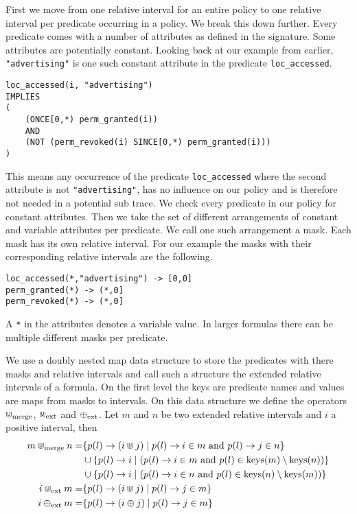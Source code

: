 First we move from one relative interval for an entire policy to one relative interval per predicate occurring in a policy.
We break this down further.
Every predicate comes with a number of attributes as defined in the signature.
Some attributes are potentially constant.
Looking back at our example from earlier, \texttt{"advertising"} is one such constant attribute in the predicate \texttt{loc\_accessed}.

\begin{verbatim}
loc_accessed(i, "advertising") 
IMPLIES 
(
    (ONCE[0,*) perm_granted(i)) 
    AND 
    (NOT (perm_revoked(i) SINCE[0,*) perm_granted(i)))
)
\end{verbatim}

This means any occurrence of the predicate \texttt{loc\_accessed} where the second attribute is not \texttt{"advertising"}, has no influence on our policy and is therefore not needed in a potential sub trace.
We check every predicate in our policy for constant attributes.
Then we take the set of different arrangements of constant and variable attributes per predicate.
We call one such arrangement a mask.
Each mask has its own relative interval.
For our example the masks with their corresponding relative intervals are the following.

\begin{verbatim}
loc_accessed(*,"advertising") -> [0,0]
perm_granted(*) -> (*,0]
perm_revoked(*) -> (*,0]
\end{verbatim}

A \texttt{*} in the attributes denotes a variable value.
In larger formulas there can be multiple different masks per predicate.

We use a doubly nested map data structure to store the predicates with there masks and relative intervals and call such a structure the extended relative intervals of a formula.
On the first level the keys are predicate names and values are maps from masks to intervals.
On this data structure we define the operators $\Cup_{\text{merge}}$, $\Cup_{\text{ext}}$ and $\oplus_{\text{ext}}$.
Let $m$ and $n$ be two extended relative intervals and $i$ a positive interval, then 
\begin{align*}
    m \Cup_{\text{merge}} n = 
        & \{ p(l) \rightarrow (i \Cup j) \mid 
            p(l) \rightarrow i \in m \text{ and } 
            p(l) \rightarrow j \in n \} \\
        & \cup \{p(l) \rightarrow i \mid  
            (p(l) \rightarrow i \in m \text{ and }
            p(l) \in \operatorname{keys}(m) \setminus \operatorname{keys}(n)) \} \\
        & \cup \{p(l) \rightarrow i \mid  
            (p(l) \rightarrow i \in n \text{ and }
            p(l) \in \operatorname{keys}(n) \setminus \operatorname{keys}(m))
            \}        
            \\
    i \Cup_{\text{ext}} m = 
        & \{ p(l) \rightarrow (i \Cup j) \mid 
            p(l) \rightarrow j \in m \} \\
    i \oplus_{\text{ext}} m = 
        & \{ p(l) \rightarrow (i \oplus j) \mid 
            p(l) \rightarrow j \in m \} \\
\end{align*}

